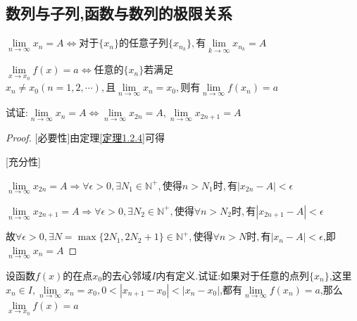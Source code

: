 \subsection{数列与子列,函数与数列的极限关系}

\begin{theorem}[数列与子列]\label{定理1.2.4}
    $\lim \limits_{n \to \infty} x_n=A \Longleftrightarrow \mbox{对于}\{x_n\}\mbox{的任意子列}\{x_{n_k}\},\mbox{有}\lim \limits_{k \to \infty} x_{n_k}=A$
\end{theorem}

\begin{theorem}[海涅定理]
    $\lim \limits_{x \to x_0} f(x)=a \Longleftrightarrow \mbox{任意的}\{x_n\}$若满足$x_n\ne x_0(n=1,2,\cdots),\mbox{且}\lim \limits_{n \to \infty} x_n=x_0,\mbox{则有}\lim \limits_{n \to \infty} f(x_n)=a$
\end{theorem}

\begin{example}
    试证:$\lim \limits_{n \to \infty} x_n=A \Longleftrightarrow \lim \limits_{n \to \infty} x_{2n}=A,\lim \limits_{n \to \infty} x_{2n+1}=A$
\end{example}

\begin{proof}

    [必要性]由定理\ref{定理1.2.4}可得

    [充分性]

    $\lim \limits_{n \to \infty} x_{2n}=A \Longrightarrow \forall \epsilon>0,\exists N_1\in \mathbb{N}^+,\mbox{使得}n>N_1\mbox{时},\mbox{有}|x_{2n}-A|<\epsilon$

    $\lim \limits_{n \to \infty} x_{2n+1}=A \Longrightarrow \forall \epsilon>0,\exists N_2\in \mathbb{N}^+,\mbox{使得}\forall n>N_2\mbox{时},\mbox{有}|x_{2n+1}-A|<\epsilon$

    故$\forall \epsilon>0,\exists N=\max\{2N_1,2N_2+1\}\in \mathbb{N}^+,\mbox{使得}\forall n>N\mbox{时},\mbox{有}|x_n-A|<\epsilon$,即$\lim \limits_{n \to \infty} x_n=A$
\end{proof}

\begin{example}
    设函数$f(x)$的在点$x_0$的去心邻域$I$内有定义.试证:如果对于任意的点列$\{x_n\}$,这里$x_n\in I,\lim \limits_{n \to \infty} x_n = x_0,0<|x_{n+1}-x_0|<|x_n-x_0|$,都有$\lim \limits_{n \to \infty} f(x_n)=a$,那么$\lim \limits_{x \to x_0} f(x)=a$
\end{example}

